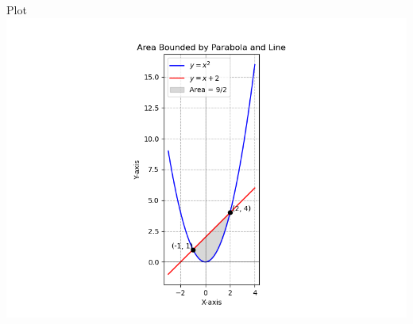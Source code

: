 \documentclass{beamer}
\begin{document}
\begin{frame}{Plot}
    \centering
    \includegraphics[width=\columnwidth, height=0.9\textheight, keepaspectratio]{figs/fig2.png}     
\end{frame}
\end{document}
